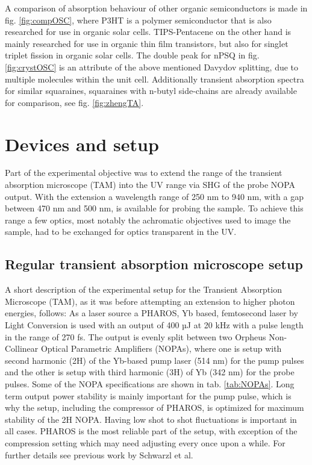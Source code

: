 \documentclass[twoside,openright]{scrreprt}
\begin{document}
A comparison of absorption behaviour of other organic semiconductors is made in fig. \ref{fig:compOSC}, where P3HT is a polymer semiconductor that is also researched for use in organic solar cells.\cite{Holliday2016} TIPS-Pentacene on the other hand is mainly researched for use in organic thin film transistors, but also for singlet triplet fission in organic solar cells.\cite{Schaberle2020} The double peak for nPSQ in fig. \ref{fig:crystOSC} is an attribute of the above mentioned Davydov splitting, due to multiple molecules within the unit cell.\cite{Balzer2022} Additionally transient absorption spectra for similar squaraines, squaraines with n-butyl side-chains are already available for comparison, see fig. \ref{fig:zhengTA}.\cite{Zheng2020}



\chapter{Devices and setup}

Part of the experimental objective was to extend the range of the transient absorption microscope (TAM) into the UV range via SHG of the probe NOPA output. With the extension a wavelength range of 250 nm to 940 nm, with a gap between 470 nm and 500 nm, is available for probing the sample. To achieve this range a few optics, most notably the achromatic objectives used to image the sample, had to be exchanged for optics transparent in the UV.
\section{Regular transient absorption microscope setup}\label{RegTAM}
A short description of the experimental setup for the Transient Absorption Microscope (TAM), as it was before attempting an extension to higher photon energies, follows:\newline
As a laser source a PHAROS, Yb based, femtosecond laser by Light Conversion is used with an output of 400 µJ at 20 kHz with a pulse length in the range of 270 fs. The output is evenly split between two Orpheus Non-Collinear Optical Parametric Amplifiers (NOPAs), where one is setup with second harmonic (2H) of the Yb-based pump laser (514 nm) for the pump pulses and the other is setup with third harmonic (3H) of Yb (342 nm) for the probe pulses. Some of the NOPA specifications are shown in tab. \ref{tab:NOPAs}. Long term output power stability is mainly important for the pump pulse, which is why the setup, including the compressor of PHAROS, is optimized for maximum stability of the 2H NOPA. Having low shot to shot fluctuations is important in all cases. PHAROS is the most reliable part of the setup, with exception of the compression setting which may need adjusting every once upon a while. For further details see previous work by Schwarzl et al.\cite{Schwarzl2022}\\
\end{document}
